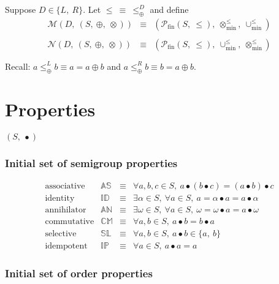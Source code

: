 \documentclass[10pt]{article}
\newcommand{\propname}[1]{{\mathbb{#1}}}
\begin{document}
Suppose $D \in \{L,\ R\}$. 
Let $\leq \ \equiv \ \leq_\oplus^{D}$ and define 
\[
\begin{array}{rcl} 
\mathcal{M}(D,\ (S,\ \oplus,\ \otimes))   
   & \equiv 
   & (\mathcal{P}_{\mathrm{fin}}(S,\ \leq),\ \otimes_{\min}^{\leq},\ \cup_{\min}^{\leq})\\
\\
\mathcal{N}(D,\ (S,\ \oplus,\ \otimes))   
   & \equiv 
   & (\mathcal{P}_{\mathrm{fin}}(S,\ \leq),\ \cup_{\min}^{\leq},\ \otimes_{\min}^{\leq})\\
\\
\end{array} 
\] 
Recall: $a \leq_\oplus^{L} b \equiv a = a\oplus b$ 
and $a \leq_\oplus^{R} b \equiv b = a\oplus b$.

\section{Properties} 

$(S,\ \bullet)$

\subsubsection{Initial set of semigroup properties}
\[ 
\begin{array}{c|ccl} 
\mbox{associative} 
   & \propname{AS} 
   & \equiv 
   & \forall a, b, c \in S,\ a \bullet (b \bullet c) = (a \bullet b) \bullet c 
   \\ 
\mbox{identity}    
   & \propname{ID} 
   & \equiv 
   & \exists \alpha\in S,\ \forall a\in S,\ a = \alpha \bullet a = a \bullet \alpha
   \\ 
\mbox{annihilator} 
   & \propname{AN} 
   & \equiv 
   & \exists \omega\in S,\ \forall a\in S,\ \omega = \omega \bullet a = a \bullet \omega
   \\ 
\mbox{commutative} 
   & \propname{CM} 
   & \equiv 
   & \forall a, b \in S,\ a\bullet b =  b\bullet a
   \\
\mbox{selective}   
   & \propname{SL} 
   & \equiv 
   & \forall a, b \in S,\ a\bullet b  \in  \{a,\ b\} 
   \\ 
\mbox{idempotent}  
   & \propname{IP} 
   & \equiv 
   & \forall a \in S,\ a\bullet a  =  a
\end{array} 
\] 

\subsubsection{Initial set of order properties}
\end{document}
